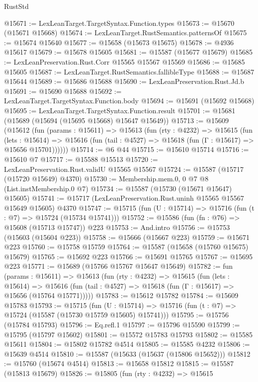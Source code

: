 \begin{lexlean}{RustStd}
\begin{coremodule}
@15671 := LexLeanTarget.TargetSyntax.Function.types
@15673 := @15670 (@15671 @15668)
@15674 := LexLeanTarget.RustSemantics.patternsOf
@15675 := @15674 @15640
@15677 := @15658 (@15673 @15675)
@15678 := @4936 @15617
@15679 := @15678 @15605
@15681 := @15587 (@15677 @15679)
@15685 := LexLeanPreservation.Rust.Corr @15565 @15567 @15569
@15686 := @15685 @15605
@15687 := LexLeanTarget.RustSemantics.fallibleType
@15688 := @15687 @15644
@15689 := @15686 @15688
@15690 := LexLeanPreservation.Rust.Jd.b
@15691 := @15690 @15688
@15692 := LexLeanTarget.TargetSyntax.Function.body
@15694 := @15691 (@15692 @15668)
@15695 := LexLeanTarget.TargetSyntax.Function.result
@15701 := @15681 (@15689 (@15694 (@15695 @15668) @15647 @15649))
@15713 := @15609
    (@15612
      (fun (params : @15611) =>
      @15613
        (fun (rty : @4232) =>
        @15615
          (fun (lets : @15614) =>
          @15616 (fun (tail : @4527) => @15618 (fun (Γ : @15617) => @15656 @15701))))))
@15714 := @6 @44
@15715 := @15610 @15714
@15716 := @15610 @7
@15717 := @15588 @15513
@15720 := LexLeanPreservation.Rust.validU @15565 @15567
@15724 := @15587 (@15717 (@15720 @15649) @4370)
@15730 := Membership.mem.{0, 0} @7 @8 (List.instMembership.{0} @7)
@15734 := @15587 (@15730 (@15671 @15647) @15605)
@15741 := @15717 (LexLeanPreservation.Rust.uninh @15565 @15567 @15649 @15605) @4370
@15747 := @15715 (fun (U : @15714) => @15716 (fun (t : @7) => @15724 (@15734 @15741)))
@15752 := @15586 (fun (fn : @76) => @15608 (@15713 @15747)) @223
@15753 := And.intro
@15756 := @15753 (@15603 (@15604 @223))
@15758 := @15666 (@15667 @223)
@15759 := @15671 @223
@15760 := @15758 @15759
@15764 := @15587 (@15658 (@15760 @15675) @15679)
@15765 := @15692 @223
@15766 := @15691 @15765
@15767 := @15695 @223
@15771 := @15689 (@15766 @15767 @15647 @15649)
@15782 := fun (params : @15611) =>
  @15613
    (fun (rty : @4232) =>
    @15615
      (fun (lets : @15614) =>
      @15616 (fun (tail : @4527) => @15618 (fun (Γ : @15617) => @15656 (@15764 @15771)))))
@15783 := @15612 @15782
@15784 := @15609 @15783
@15793 := @15715
    (fun (U : @15714) => @15716 (fun (t : @7) => @15724 (@15587 (@15730 @15759 @15605) @15741)))
@15795 := @15756 (@15784 @15793)
@15796 := Eq.refl.{1}
@15797 := @15796 @15590
@15799 := @15795 (@15797 @15602)
@15801 := @15572 @15783 @15793
@15802 := @15585 @15611
@15804 := @15802 @15782 @4514
@15805 := @15585 @4232
@15806 := @15639 @4514
@15810 := @15587 (@15633 (@15637 (@15806 @15652)))
@15812 := @15760 (@15674 @4514)
@15813 := @15658 @15812
@15815 := @15587 (@15813 @15679)
@15826 := @15805
    (fun (rty : @4232) =>
    @15615

\end{coremodule}
\end{lexlean}
